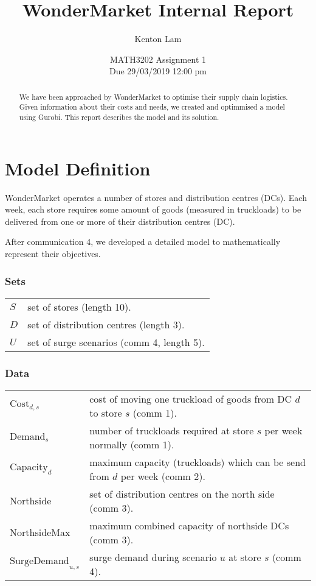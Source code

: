 \documentclass[11pt,a4paper]{article}
\author{Kenton Lam}
\date{{MATH3202 Assignment 1 \\ Due 29/03/2019 12:00 pm}}
\title{WonderMarket Internal Report}
\begin{document}
\maketitle
\begin{abstract}
    We have been approached by WonderMarket to optimise their supply chain logistics.
    Given information about their costs and needs, we created and optimmised a model using Gurobi.
    This report describes the model and its solution.
\end{abstract}

\part{Model Definition}
WonderMarket operates a number of stores and distribution centres (DCs).
Each week, each store requires some amount of goods (measured in truckloads)
to be delivered from one or more of their distribution centres (DC).

After communication 4, we developed a detailed model to mathematically represent
their objectives.

\section{Sets}
\begin{tabular}{l l}
    $S$ & set of stores (length 10). \\ 
    $D$ & set of distribution centres (length 3). \\ 
    $U$ & set of surge scenarios (comm 4, length 5).   
\end{tabular}

\section{Data}
\begin{tabular}{l l}
    $\mathrm{Cost}_{d,s}$ & cost of moving one truckload of goods from DC $d$ to store $s$ (comm 1). \\ 
    $\mathrm{Demand}_s$ & number of truckloads required at store $s$ per week normally (comm 1). \\
    $\mathrm{Capacity}_d$ & maximum capacity (truckloads) which can be send from $d$ per week (comm 2). \\ 
    $\mathrm{Northside}$ & set of distribution centres on the north side (comm 3). \\ 
    $\mathrm{NorthsideMax}$ & maximum combined capacity of northside DCs (comm 3). \\ 
    $\mathrm{SurgeDemand}_{u,s}$ & surge demand during scenario $u$ at store $s$ (comm 4).
\end{tabular}
\end{document}
